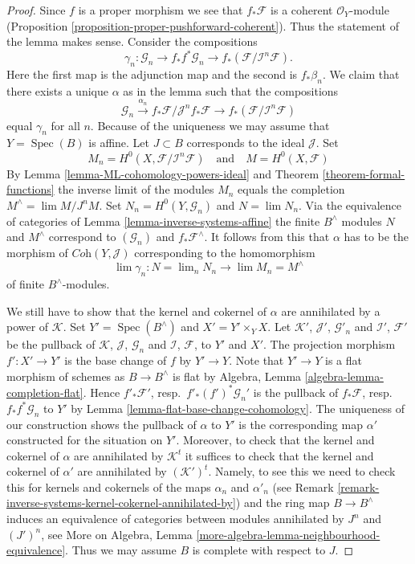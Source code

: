 \documentclass[10pt,a4paper]{amsart}
\theoremstyle{plain}
\theoremstyle{definition}
\theoremstyle{remark}
\numberwithin{equation}{subsection}
\def\lim{\mathop{\mathrm{lim}}\nolimits}
\def\Spec{\mathop{\mathrm{Spec}}}
\begin{document}
\begin{proof}
Since $f$ is a proper morphism we see that $f_*\mathcal{F}$
is a coherent $\mathcal{O}_Y$-module
(Proposition \ref{proposition-proper-pushforward-coherent}).
Thus the statement of the lemma makes sense.
Consider the compositions
$$
\gamma_n : \mathcal{G}_n \to
f_*f^*\mathcal{G}_n \to
f_*(\mathcal{F}/\mathcal{I}^n\mathcal{F}).
$$
Here the first map is the adjunction map and the second is $f_*\beta_n$.
We claim that there exists a unique $\alpha$ as in the lemma
such that the compositions
$$
\mathcal{G}_n \xrightarrow{\alpha_n}
f_*\mathcal{F}/\mathcal{J}^nf_*\mathcal{F} \to
f_*(\mathcal{F}/\mathcal{I}^n\mathcal{F})
$$
equal $\gamma_n$ for all $n$. Because of the uniqueness we may assume
that $Y = \Spec(B)$ is affine. Let $J \subset B$ corresponds to the
ideal $\mathcal{J}$. Set
$$
M_n = H^0(X, \mathcal{F}/\mathcal{I}^n\mathcal{F})
\quad\text{and}\quad
M = H^0(X, \mathcal{F})
$$
By Lemma \ref{lemma-ML-cohomology-powers-ideal} and
Theorem \ref{theorem-formal-functions}
the inverse limit of the modules
$M_n$ equals the completion $M^\wedge = \lim M/J^nM$.
Set $N_n = H^0(Y, \mathcal{G}_n)$ and $N = \lim N_n$.
Via the equivalence of categories of
Lemma \ref{lemma-inverse-systems-affine}
the finite $B^\wedge$ modules $N$ and $M^\wedge$ correspond
to $(\mathcal{G}_n)$ and $f_*\mathcal{F}^\wedge$.
It follows from this that $\alpha$ has to be the morphism of
$\textit{Coh}(Y, \mathcal{J})$ corresponding to the homomorphism
$$
\lim \gamma_n : N = \lim_n N_n \longrightarrow \lim M_n = M^\wedge
$$
of finite $B^\wedge$-modules.

\medskip\noindent
We still have to show that the kernel and cokernel of $\alpha$ are
annihilated by a power of $\mathcal{K}$. Set $Y' = \Spec(B^\wedge)$
and $X' = Y' \times_Y X$. Let $\mathcal{K}'$, $\mathcal{J}'$, $\mathcal{G}'_n$
and $\mathcal{I}'$, $\mathcal{F}'$ be the pullback of
$\mathcal{K}$, $\mathcal{J}$, $\mathcal{G}_n$ and
$\mathcal{I}$, $\mathcal{F}$, to $Y'$ and $X'$.
The projection morphism $f' : X' \to Y'$ is the base change of
$f$ by $Y' \to Y$. Note that $Y' \to Y$ is a flat morphism of schemes
as $B \to B^\wedge$ is flat by
Algebra, Lemma \ref{algebra-lemma-completion-flat}.
Hence $f'_*\mathcal{F}'$, resp.\ $f'_*(f')^*\mathcal{G}_n'$
is the pullback of $f_*\mathcal{F}$, resp.\ $f_*f^*\mathcal{G}_n$
to $Y'$ by Lemma \ref{lemma-flat-base-change-cohomology}.
The uniqueness of our construction shows the pullback of $\alpha$ to $Y'$
is the corresponding map $\alpha'$ constructed for the situation on $Y'$.
Moreover, to check that the kernel and cokernel of $\alpha$ are
annihilated by $\mathcal{K}^t$ it suffices to check that the
kernel and cokernel of $\alpha'$ are annihilated by
$(\mathcal{K}')^t$. Namely, to see this we need to check this for
kernels and cokernels of the maps $\alpha_n$ and $\alpha'_n$
(see Remark \ref{remark-inverse-systems-kernel-cokernel-annihilated-by})
and the ring map $B \to B^\wedge$ induces
an equivalence of categories between modules annihilated by
$J^n$ and $(J')^n$, see
More on Algebra, Lemma \ref{more-algebra-lemma-neighbourhood-equivalence}.
Thus we may assume $B$ is complete with respect to $J$.


\end{proof}
\end{document}
